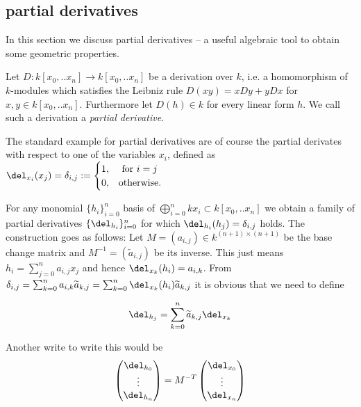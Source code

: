 \subsection{partial derivatives}

In this section we discuss partial derivatives -- a useful algebraic tool to obtain some geometric properties.

\begin{definition}
Let $D : k[x_0,..x_n] \to k[x_0,..x_n]$ be a derivation over $k$, i.e. a homomorphism of $k$-modules which satisfies the Leibniz rule $D(xy) = xDy+yDx$ for $x,y \in k[x_0,..x_n]$. Furthermore let $D(h) \in k$ for every linear form $h$. We call such a derivation a \emph{partial derivative}.
\end{definition}

\begin{example}
The standard example for partial derivatives are of course the partial derivates with respect to one of the variables $x_i$, defined as $\del_{x_i}(x_j) = \delta_{i,j} := \begin{cases} 1, & \text{ for } i = j \\ 0, & \text {otherwise.} \end{cases}$
\end{example}

\begin{example}
For any monomial $\{ h_i\}_{i=0}^n$ basis of $\bigoplus_{i=0}^n kx_i \subset k[x_0,..x_n]$ we obtain a family of partial derivatives $\{ \del_{h_i} \}_{i=0}^n$ for which $\del_{h_i}(h_j) = \delta_{i,j}$ holds. The construction goes as follows: Let $M = (a_{i,j})  \in k^{(n+1)\times(n+1)}$ be the base change matrix and $M^{-1} = (\widetilde a_{i,j})$ be its inverse.
This just means $h_i = \sum_{j=0}^n a_{i,j} x_j$ and hence $\del_{x_k}(h_i) = a_{i,k}$.
From $\delta_{i,j} = \sum_{k=0}^n a_{i,k}\widetilde a_{k,j}
= \sum_{k=0}^n \del_{x_k}(h_i) \widetilde a_{k,j}$ it is obvious that we need to define

\begin{equation}
\del_{h_j} = \sum_{k=0}^n \widetilde a_{k,j} \del_{x_k}
\end{equation}

Another write to write this would be
\begin{equation}
\begin{pmatrix} \del_{h_0} \\ \vdots \\ \del_{h_n} \end{pmatrix}
= M^{-T}
\begin{pmatrix} \del_{x_0} \\ \vdots \\ \del_{x_n} \end{pmatrix}
\end{equation}
\end{example}

